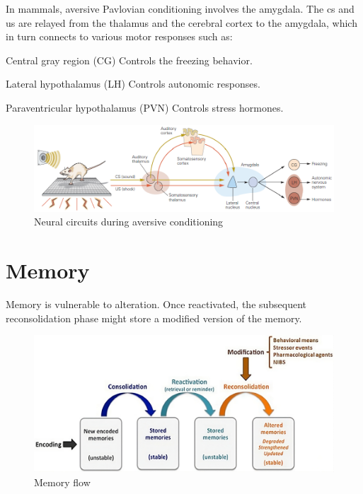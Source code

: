 \begin{remark} 
    In mammals, aversive Pavlovian conditioning involves the amygdala.
    The \ac{cs} and \ac{us} are relayed from the thalamus and the cerebral cortex to the amygdala, 
    which in turn connects to various motor responses such as:
    \begin{descriptionlist}
        \item[Central gray region (CG)] Controls the freezing behavior.
        \item[Lateral hypothalamus (LH)] Controls autonomic responses.
        \item[Paraventricular hypothalamus (PVN)] Controls stress hormones.
    \end{descriptionlist}

    \begin{figure}[H]
        \centering
        \includegraphics[width=0.9\linewidth]{./img/amygdala_pavlovian.png}
        \caption{Neural circuits during aversive conditioning}
    \end{figure}
\end{remark}



\section{Memory}

Memory is vulnerable to alteration.
Once reactivated, the subsequent reconsolidation phase might store a modified version of the memory.

\begin{figure}[H]
    \centering
    \includegraphics[width=0.6\linewidth]{./img/memory.png}
    \caption{Memory flow}
\end{figure}

